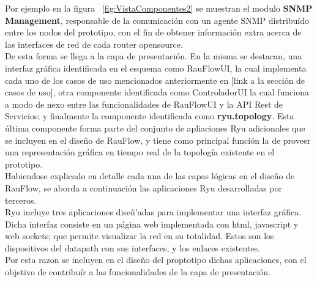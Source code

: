 Por ejemplo en la figura ~\ref{fig:VistaComponentes2} se muestran el modulo \textbf{SNMP Management}, responsable de  la comunicaci\'on con un agente SNMP distribu\'ido entre los nodos del prototipo, con el fin de obtener informaci\'on extra acerca de las interfaces de red de cada router opensource.\\

De esta forma se llega a la capa de presentaci\'on. En la misma se destacan, una interfaz gr\'afica identificada en el esquema como RauFlowUI, la cual implementa cada uno de los casos de uso mencionados anteriormente en [link a la secci\'on de casos de uso], otra componente identificada como ControladorUI la cual funciona a modo de nexo entre las funcionalidades de RauFlowUI y la API Rest de Servicios; y finalmente la componente identificada como \textbf{ryu.topology}. Esta \'ultima componente forma parte del conjunto de apliaciones Ryu adicionales que se incluyen en el dise\~no de RauFlow, y tiene como principal funci\'on la de proveer una representaci\'on gr\'afica en tiempo real de la topolog\'ia existente en el prototipo.\\

Habiendose explicado en detalle cada una de las capas l\'ogicas en el dise\~no de RauFlow, se aborda a continuaci\'on las aplicaciones Ryu desarrolladas por terceros.\\

Ryu incluye tres aplicaciones dise\~n'adas para implementar una interfaz gr\'afica. Dicha interfaz consiste en un p\'agina web implementada con html, javascript y web sockets; que permite visualizar la red en su totalidad. Estos son los dispositivos del datapath con sus interfaces, y los enlaces existentes.\\
Por esta razon se incluyen en el dise\~no del proptotipo dichas aplicaciones, con el objetivo de contribu\'ir a las funcionalidades de la capa de presentaci\'on.


